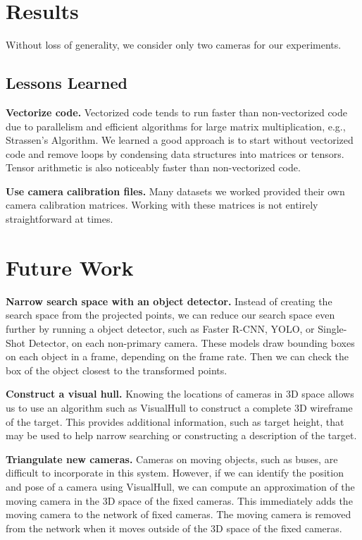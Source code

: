 \documentclass{article}
\begin{document}
\section{Results}
\label{sec:results}
Without loss of generality, we consider only two cameras for our experiments.

\subsection{Lessons Learned}
\vspace{5pt}
\noindent\textbf{Vectorize code.} Vectorized code tends to run faster than non-vectorized code due to parallelism and efficient algorithms for large matrix multiplication, e.g., Strassen's Algorithm. We learned a good approach is to start without vectorized code and remove loops by condensing data structures into matrices or tensors. Tensor arithmetic is also noticeably faster than non-vectorized code.

\vspace{5pt}
\noindent\textbf{Use camera calibration files.} Many datasets we worked provided their own camera calibration matrices. Working with these matrices is not entirely straightforward at times.

\section{Future Work}
\label{sec:future}
\vspace{5pt}
\noindent\textbf{Narrow search space with an object detector.} Instead of creating the search space from the projected points, we can reduce our search space even further by running a object detector, such as Faster R-CNN, YOLO, or Single-Shot Detector, on each non-primary camera. These models draw bounding boxes on each object in a frame, depending on the frame rate. Then we can check the box of the object closest to the transformed points.

\vspace{5pt}
\noindent\textbf{Construct a visual hull.} Knowing the locations of cameras in 3D space allows us to use an algorithm such as VisualHull to construct a complete 3D wireframe of the target. This provides additional information, such as target height, that may be used to help narrow searching or constructing a description of the target.

\vspace{5pt}
\noindent\textbf{Triangulate new cameras.} Cameras on moving objects, such as buses, are difficult to incorporate in this system. However, if we can identify the position and pose of a camera using VisualHull, we can compute an approximation of the moving camera in the 3D space of the fixed cameras. This immediately adds the moving camera to the network of fixed cameras. The moving camera is removed from the network when it moves outside of the 3D space of the fixed cameras.



\end{document}
